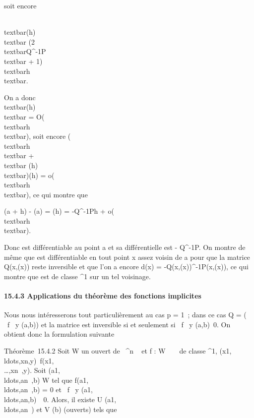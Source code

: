soit encore

\\textbar{}\theta(h)\\textbar{} \leq
(2\\textbar{}Q^-1P\\textbar{} +
1)\\textbar{}h\\textbar{}.

On a donc \\textbar{}\theta(h)\\textbar{} =
O(\\textbar{}h\\textbar{}), soit encore
(\\textbar{}h\\textbar{}
+\\textbar{} \theta(h)\\textbar{})\eta(h) =
o(\\textbar{}h\\textbar{}), ce qui montre
que

\phi(a + h) - \phi(a) = \theta(h) = -Q^-1Ph +
o(\\textbar{}h\\textbar{}).

Donc \phi est différentiable au point a et sa différentielle est -
Q^-1P. On montre de même que \phi est différentiable en tout
point x assez voisin de a pour que la matrice Q(x,\phi(x)) reste inversible
et que l'on a encore d\phi(x) = -Q(x,\phi(x))^-1P(x,\phi(x)), ce qui
montre que \phi est de classe ^1 sur un tel voisinage.

\paragraph{15.4.3 Applications du théorème des fonctions implicites}

Nous nous intéresserons tout particulièrement au cas p = 1~; dans ce cas
Q = \left (\matrix\, \partial~f
\over \partial~y (a,b)\right ) et la matrice
est inversible si et seulement si  \partial~f \over \partial~y
(a,b)\neq~0. On obtient donc la formulation
suivante

Théorème~15.4.2 Soit W un ouvert de ~^n \times {}~ et f : W \rightarrow~ ~ de
classe ^1,
(x1,\\ldots,xn,y)\mapsto~f(x1,\\\ldots,xn~,y).
Soit
(a1,\\ldots,an~,b)
\in W tel que
f(a1,\\ldots,an~,b)
= 0 et  \partial~f \over \partial~y
(a1,\\ldots,an,b)\mathrel\neq~~0.
Alors, il existe U
\inV(a1,\\ldots,an~)
et V \inV(b) (ouverts) tels que

